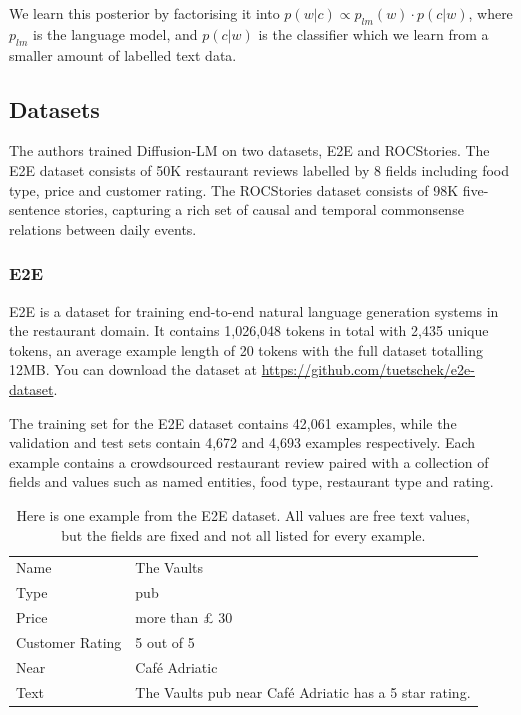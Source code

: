 We learn this posterior by factorising it into $p(w|c) \propto p_{lm}(w) \cdot p(c|w)$, where $p_{lm}$ is the language model, and $p(c|w)$ is the classifier which we learn from a smaller amount of labelled text data.

\subsection{Datasets}


The authors trained Diffusion-LM on two datasets, E2E and ROCStories. The E2E dataset consists of 50K restaurant reviews labelled by 8 fields including food type, price and customer rating. The ROCStories dataset consists of 98K five-sentence stories, capturing a rich set of causal and temporal commonsense relations between daily events.

\subsubsection{E2E}

E2E\cite{novikova2017e2e} is a dataset for training end-to-end natural language generation systems in the restaurant domain. It contains 1,026,048 tokens in total with 2,435 unique tokens, an average example length of 20 tokens with the full dataset totalling 12MB. You can download the dataset at \href{https://github.com/tuetschek/e2e-dataset}{https://github.com/tuetschek/e2e-dataset}.

The training set for the E2E dataset contains 42,061 examples, while the validation and test sets contain 4,672 and 4,693 examples respectively. Each example contains a crowdsourced restaurant review paired with a collection of fields and values such as named entities, food type, restaurant type and rating.

\begin{table}
  \centering
  \begin{tabular}{ | m{3cm} | m{7cm}| } 
    \hline
    Name & The Vaults \\ 
    Type & pub \\ 
    Price & more than £ 30 \\
    Customer Rating & 5 out of 5 \\
    Near & Café Adriatic \\
    Text & The Vaults pub near Café Adriatic has a 5 star rating. \\
    \hline
  \end{tabular}
  \caption{Here is one example from the E2E dataset. All values are free text values, but the fields are fixed and not all listed for every example.}
\end{table}

